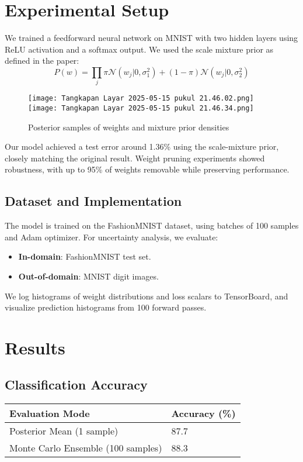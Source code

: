 \documentclass{article}
\begin{document}
\section{Experimental Setup}

We trained a feedforward neural network on MNIST with two hidden layers using ReLU activation and a softmax output. We used the scale mixture prior as defined in the paper:
\[
P(w) = \prod_j \pi \mathcal{N}(w_j | 0, \sigma_1^2) + (1 - \pi) \mathcal{N}(w_j | 0, \sigma_2^2)
\]

\begin{figure}[H]
\centering
\texttt{[image: Tangkapan Layar 2025-05-15 pukul 21.46.02.png]}
\texttt{[image: Tangkapan Layar 2025-05-15 pukul 21.46.34.png]}
\caption{Posterior samples of weights and mixture prior densities}
\end{figure}

Our model achieved a test error around 1.36\% using the scale-mixture prior, closely matching the original result. Weight pruning experiments showed robustness, with up to 95\% of weights removable while preserving performance.


\subsection{Dataset and Implementation}

The model is trained on the FashionMNIST dataset, using batches of 100 samples and Adam optimizer. For uncertainty analysis, we evaluate:
\begin{itemize}
    \item \textbf{In-domain}: FashionMNIST test set.
    \item \textbf{Out-of-domain}: MNIST digit images.
\end{itemize}

We log histograms of weight distributions and loss scalars to TensorBoard, and visualize prediction histograms from 100 forward passes.

\section{Results}

\subsection{Classification Accuracy}

\begin{center}
\begin{tabular}{@{}ll@{}}
\toprule
Evaluation Mode & Accuracy (\%) \\
\midrule
Posterior Mean (1 sample) & 87.7 \\
Monte Carlo Ensemble (100 samples) & 88.3 \\
\bottomrule
\end{tabular}
\end{center}
\end{document}
